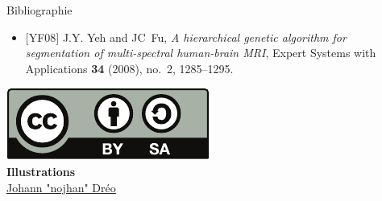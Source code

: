 \documentclass{beamer}
\begin{document}
\begin{frame}[allowframebreaks]{Bibliographie}
\begin{itemize}
        \item $[$YF08$]$
        J.Y. Yeh and JC~Fu,
        \emph{{A hierarchical genetic algorithm for segmentation of
        multi-spectral human-brain MRI}},
        Expert Systems with Applications
        \textbf{34} (2008), no.~2, 1285--1295.
    \end{itemize}
\end{frame}

\begin{frame}
    \begin{center}
        \href{http://creativecommons.org/licenses/by-sa/2.0/fr/}{\includegraphics[width=.40\linewidth]{images/cc_by_sa}}
        \\[3em]
        \textbf{Illustrations}\\\medskip
        \href{http://commons.wikimedia.org/wiki/User:Nojhan}{Johann "nojhan" Dréo} 
    \end{center}
\end{frame}
\end{document}
